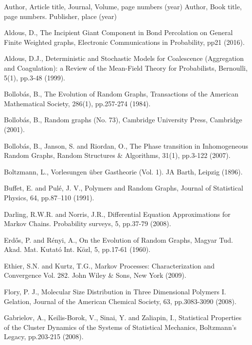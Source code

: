 \documentclass[11pt, notitlepage]{article}
\begin{document}
\begin{thebibliography}{}
%
%
Author, Article title, Journal, Volume, page numbers (year)
Author, Book title, page numbers. Publisher, place (year)

 Aldous, D., The Incipient Giant Component in Bond Percolation on General Finite Weighted graphs, Electronic Communications in Probability, pp21 (2016).

 Aldous, D.J., Deterministic and Stochastic Models for Coalescence (Aggregation and Coagulation): a Review of the Mean-Field Theory for Probabilists, Bernoulli, 5(1), pp.3-48 (1999).

 Bollob\'as, B., The Evolution of Random Graphs, Transactions of the American Mathematical Society, 286(1), pp.257-274 (1984).

 Bollob\'as, B., Random graphs (No. 73), Cambridge University Press, Cambridge (2001).


 Bollob\'as, B., Janson, S. and Riordan, O., The Phase transition in Inhomogeneous Random Graphs, Random Structures \& Algorithms, 31(1), pp.3-122 (2007).

 Boltzmann, L., Vorlesungen \"uber Gastheorie (Vol. 1). JA Barth, Leipzig (1896).

 Buffet, E. and Pul{\'e}, J. V., Polymers and Random Graphs, Journal of Statistical Physics, 64, pp.87--110 (1991).

 Darling, R.W.R. and Norris, J.R., Differential Equation Approximations for Markov Chains. Probability surveys, 5, pp.37-79 (2008).

 Erd\H{o}s, P. and R\'{e}nyi, A., On the Evolution of Random Graphs, Magyar Tud. Akad. Mat. Kutat\'{o} Int. K\"{o}zl, 5, pp.17-61 (1960).

 Ethier, S.N. and Kurtz, T.G., Markov Processes: Characterization and Convergence Vol. 282. John Wiley \& Sons, New York (2009).


 Flory, P. J., Molecular Size Distribution in Three Dimensional Polymers {I}. Gelation, Journal of the American Chemical Society, 63, pp.3083-3090 (2008).


 Gabrielov, A., Keilis-Borok, V., Sinai, Y. and Zaliapin, I., Statistical Properties of the Cluster Dynamics of the Systems of Statistical Mechanics, Boltzmann's Legacy, pp.203-215 (2008).


\end{thebibliography}
\end{document}
